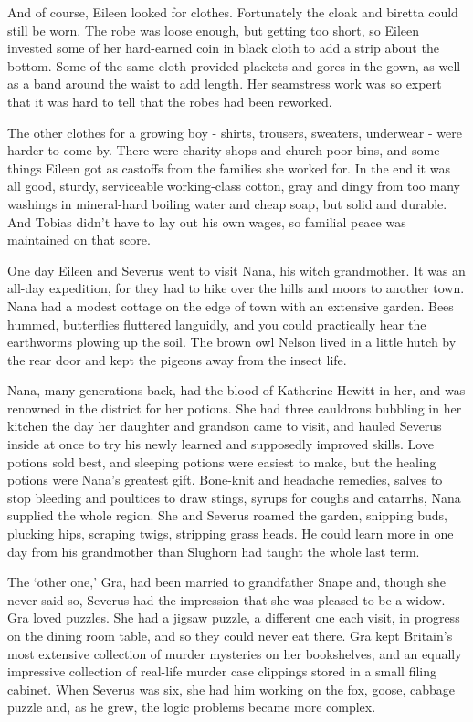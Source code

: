\documentclass[a4paper,11pt]{article}
\begin{document}
And of course, Eileen looked for clothes. Fortunately the cloak and biretta could still be worn. The robe was loose enough, but getting too short, so Eileen invested some of her hard-earned coin in black cloth to add a strip about the bottom. Some of the same cloth provided plackets and gores in the gown, as well as a band around the waist to add length. Her seamstress work was so expert that it was hard to tell that the robes had been reworked.

The other clothes for a growing boy - shirts, trousers, sweaters, underwear - were harder to come by. There were charity shops and church poor-bins, and some things Eileen got as castoffs from the families she worked for. In the end it was all good, sturdy, serviceable working-class cotton, gray and dingy from too many washings in mineral-hard boiling water and cheap soap, but solid and durable. And Tobias didn't have to lay out his own wages, so familial peace was maintained on that score.

One day Eileen and Severus went to visit Nana, his witch grandmother. It was an all-day expedition, for they had to hike over the hills and moors to another town. Nana had a modest cottage on the edge of town with an extensive garden. Bees hummed, butterflies fluttered languidly, and you could practically hear the earthworms plowing up the soil. The brown owl Nelson lived in a little hutch by the rear door and kept the pigeons away from the insect life.

Nana, many generations back, had the blood of Katherine Hewitt in her, and was renowned in the district for her potions. She had three cauldrons bubbling in her kitchen the day her daughter and grandson came to visit, and hauled Severus inside at once to try his newly learned and supposedly improved skills. Love potions sold best, and sleeping potions were easiest to make, but the healing potions were Nana's greatest gift. Bone-knit and headache remedies, salves to stop bleeding and poultices to draw stings, syrups for coughs and catarrhs, Nana supplied the whole region. She and Severus roamed the garden, snipping buds, plucking hips, scraping twigs, stripping grass heads. He could learn more in one day from his grandmother than Slughorn had taught the whole last term.

The `other one,' Gra, had been married to grandfather Snape and, though she never said so, Severus had the impression that she was pleased to be a widow. Gra loved puzzles. She had a jigsaw puzzle, a different one each visit, in progress on the dining room table, and so they could never eat there. Gra kept Britain's most extensive collection of murder mysteries on her bookshelves, and an equally impressive collection of real-life murder case clippings stored in a small filing cabinet. When Severus was six, she had him working on the fox, goose, cabbage puzzle and, as he grew, the logic problems became more complex.
\end{document}
